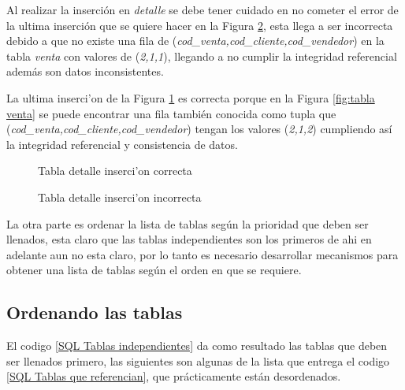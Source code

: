 Al realizar la inserci\'on en \textit{detalle} se debe tener cuidado en no cometer el error de la ultima inserci\'on que se quiere hacer en la Figura \ref{fig:InsercionIncorrecta}, esta llega a ser incorrecta debido a que no existe una fila de (\textit{cod\_venta,cod\_cliente,cod\_vendedor}) en la tabla \textit{venta} con valores de (\textit{2,1,1}), llegando a no cumplir la integridad referencial adem\'as son datos inconsistentes. 

La ultima inserci'on de la Figura \ref{fig:InsercionCorrecta} es correcta porque en la Figura \ref{fig:tabla venta} se puede encontrar una fila tambi\'en conocida como tupla que (\textit{cod\_venta,cod\_cliente,cod\_vendedor}) tengan los valores (\textit{2,1,2}) cumpliendo as\'i la integridad referencial y consistencia de datos.

\begin{figure}[H]
\centering
{}
\caption{Tabla detalle inserci'on correcta} \label{fig:InsercionCorrecta}
\end{figure}

\begin{figure}[H]
\centering
{}
\caption{Tabla detalle inserci'on incorrecta} \label{fig:InsercionIncorrecta}
\end{figure}  
  
La otra parte es ordenar la lista de tablas seg\'un la prioridad que deben ser llenados, esta claro que las tablas independientes son los primeros de ahi en adelante aun no esta claro, por lo tanto es necesario desarrollar mecanismos para obtener una lista de tablas seg\'un el orden en que se requiere.
\subsection{Ordenando las tablas}
El codigo \ref{SQL Tablas independientes} da  como resultado las tablas que deben ser llenados primero, las siguientes son algunas de la lista que entrega el codigo \ref{SQL Tablas que referencian}, que pr\'acticamente est\'an desordenados.

